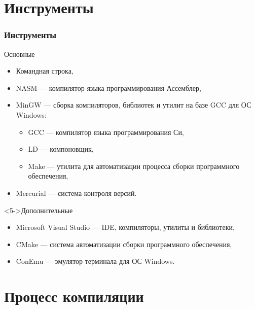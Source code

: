 \documentclass[pdf,9pt,aspectratio=169]{beamer}
\begin{document}
\section{Инструменты}

\begin{frame}\frametitle{Инструменты}
  \begin{block}{Основные}
    \begin{itemize}
      \item<1-> Командная строка,
      \item<2-> NASM --- компилятор языка программирования Ассемблер,
      \item<3-> MinGW --- сборка компиляторов, библиотек и утилит на базе GCC для ОС Windows:
      \begin{itemize}
        \item GCC --- компилятор языка программирования Си,
        \item LD --- компоновщик,
        \item Make --- утилита для автоматизации процесса сборки программного обеспечения,
      \end{itemize}
      \item<4-> Mercurial --- система контроля версий.
    \end{itemize}      
  \end{block}
  \begin{block}<5->{Дополнительные}
    \begin{itemize}
      \item Microsoft Visual Studio --- IDE, компиляторы, утилиты и библиотеки,
      \item CMake --- система автоматизации сборки программного обеспечения,
      \item ConEmu --- эмулятор терминала для ОС Windows.
    \end{itemize}      
  \end{block}
\end{frame}

\section{Процесс компиляции}
\end{document}

